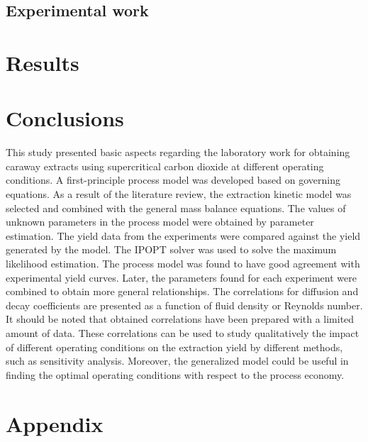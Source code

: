 \documentclass[a4paper,fleqn]{cas-dc}
\begin{document}
\subsection{Experimental work}


\section{Results}


\section{Conclusions} \label{CH: Conclusion}

This study presented basic aspects regarding the laboratory work for obtaining caraway extracts using supercritical carbon dioxide at different operating conditions. A first-principle process model was developed based on governing equations. As a result of the literature review, the extraction kinetic model was selected and combined with the general mass balance equations. The values of unknown parameters in the process model were obtained by parameter estimation. The yield data from the experiments were compared against the yield generated by the model. The IPOPT solver was used to solve the maximum likelihood estimation. The process model was found to have good agreement with experimental yield curves. Later, the parameters found for each experiment were combined to obtain more general relationships. The correlations for diffusion and decay coefficients are presented as a function of fluid density or Reynolds number. It should be noted that obtained correlations have been prepared with a limited amount of data. These correlations can be used to study qualitatively the impact of different operating conditions on the extraction yield by different methods, such as sensitivity analysis. Moreover, the generalized model could be useful in finding the optimal operating conditions with respect to the process economy.

\clearpage
%



\clearpage \appendix \label{appendix}
\section{Appendix} 
\end{document}

